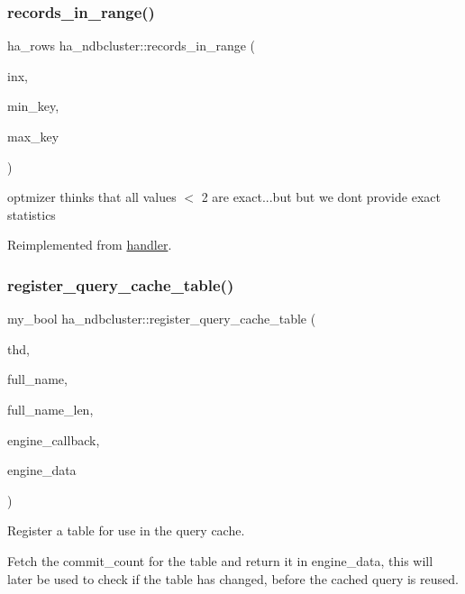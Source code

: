 \subsubsection{\texorpdfstring{records\+\_\+in\+\_\+range()}{records\_in\_range()}}
{\footnotesize\ttfamily ha\+\_\+rows ha\+\_\+ndbcluster\+::records\+\_\+in\+\_\+range (\begin{DoxyParamCaption}\item[{uint}]{inx,  }\item[{key\+\_\+range $\ast$}]{min\+\_\+key,  }\item[{key\+\_\+range $\ast$}]{max\+\_\+key }\end{DoxyParamCaption})\hspace{0.3cm}{\ttfamily [virtual]}}

optmizer thinks that all values $<$ 2 are exact...but but we don\textquotesingle{}t provide exact statistics

Reimplemented from \mbox{\hyperlink{classhandler}{handler}}.

\mbox{\label{classha__ndbcluster_abef3e8ffe1d4b952fc59b356d3d5f142}} 
\subsubsection{\texorpdfstring{register\+\_\+query\+\_\+cache\+\_\+table()}{register\_query\_cache\_table()}}
{\footnotesize\ttfamily my\+\_\+bool ha\+\_\+ndbcluster\+::register\+\_\+query\+\_\+cache\+\_\+table (\begin{DoxyParamCaption}\item[{T\+HD $\ast$}]{thd,  }\item[{char $\ast$}]{full\+\_\+name,  }\item[{size\+\_\+t}]{full\+\_\+name\+\_\+len,  }\item[{qc\+\_\+engine\+\_\+callback $\ast$}]{engine\+\_\+callback,  }\item[{ulonglong $\ast$}]{engine\+\_\+data }\end{DoxyParamCaption})\hspace{0.3cm}{\ttfamily [virtual]}}

Register a table for use in the query cache.

Fetch the commit\+\_\+count for the table and return it in engine\+\_\+data, this will later be used to check if the table has changed, before the cached query is reused.


